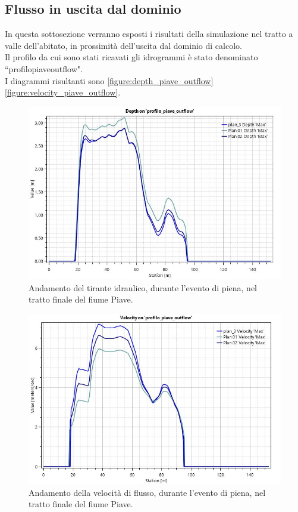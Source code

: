 \subsection{Flusso in uscita dal dominio}
In questa sottosezione verranno esposti i risultati della simulazione nel tratto a valle dell'abitato, in prossimità dell'uscita dal dominio di calcolo.\\
Il profilo da cui sono stati ricavati gli idrogrammi è stato denominato  ``profilo\textunderscore piave\textunderscore outflow".\\
I diagrammi risultanti sono \eqref{figure:depth_piave_outflow}\eqref{figure:velocity_piave_outflow}.

\begin{figure}[H] \centering
    \includegraphics[scale=0.5]{immagini/depth_piave_outflow.JPG}
    \caption{Andamento del tirante idraulico, durante l'evento di piena, nel tratto finale del fiume Piave.}
    \label{figure:depth_piave_outflow}
\end{figure}

\begin{figure}[H] \centering
    \includegraphics[scale=0.5]{immagini/velocity_piave_outflow.JPG}
    \caption{Andamento della velocità di flusso, durante l'evento di piena, nel tratto finale del fiume Piave.}
    \label{figure:velocity_piave_outflow}
\end{figure}

